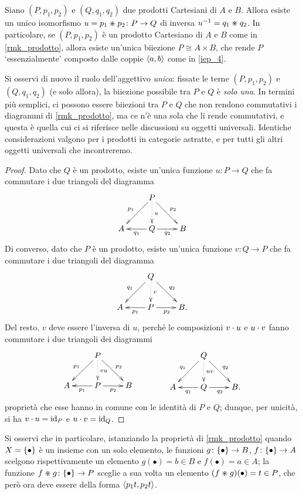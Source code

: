 \begin{lemma}\label{prodotto_unico_upto_iso}
 Siano \((P,p_1,p_2)\) e \((Q,q_1,q_2)\) due prodotti	Cartesiani di \(A\) e \(B\). Allora esiste un unico isomorfismo \(u= p_1\divideontimes p_2 \colon P\to Q\) di inversa \(u^{-1} = q_1\divideontimes q_2\). In particolare, se \((P,p_1,p_2)\) è un prodotto Cartesiano di \(A\) e \(B\) come in \ref{rmk_prodotto}, allora esiste un'unica biiezione \(P\cong A\times B\), che rende \(P\) `essenzialmente' composto dalle coppie \(\langle a,b\rangle\) come in \ref{iep_4}.
\end{lemma}
Si osservi di nuovo il ruolo dell'aggettivo \emph{unica}: fissate le terne \((P,p_1,p_2)\) e \((Q,q_1,q_2)\) (e solo allora), la biiezione possibile tra \(P\) e \(Q\) è \emph{solo una}. In termini più semplici, ci possono essere biiezioni tra \(P\) e \(Q\) che non rendono commutativi i diagrammi di \ref{rmk_prodotto}, ma ce n'è una sola che li rende commutativi, e questa è quella cui ci si riferisce nelle discussioni su oggetti universali. Identiche considerazioni valgono per i prodotti	in categorie astratte, e per tutti gli altri oggetti universali che incontreremo.
\begin{proof}
 Dato che \(Q\) è un prodotto, esiste un'unica	funzione \(u \colon P \to Q\) che fa commutare i due triangoli del diagramma
 \[\xymatrix{
   & P \ar@{.>}[d]^{u} \ar[dl]_{p_1} \ar[dr]^{p_2}\\
   A & Q \ar[r]_{q_2}\ar[l]^{q_1}& B
  }\]
 Di converso, dato che	\(P\) è un prodotto, esiste un'unica funzione \(v \colon Q \to P\) che fa commutare i due triangoli del diagramma
 \[\xymatrix{
   & Q \ar@{.>}[d]^v \ar[dl]_{q_1} \ar[dr]^{q_2}\\
   A & P \ar[r]_{p_2}\ar[l]^{p_1}& B.
  }\]
 Del resto, \(v\) deve essere l'inversa di \(u\), perché le composizioni \(v\cdot u\) e \(u\cdot v\) fanno commutare i due triangoli dei diagrammi
 \[\xymatrix{
   & P \ar@{.>}[d]^{vu} \ar[dl]_{p_1} \ar[dr]^{p_2}\\
   A & P \ar[r]_{p_2}\ar[l]^{p_1}& B
  }\qquad\qquad \xymatrix{
   & Q \ar@{.>}[d]^{uv} \ar[dl]_{q_1} \ar[dr]^{q_2}\\
   A & Q \ar[r]_{q_2}\ar[l]^{q_1}& B.
  }\]
 proprietà che esse hanno in comune con	le identità di \(P\) e \(Q\); dunque, per unicità, si ha \(v\cdot u = \mathrm{id}_P\) e \(u\cdot v = \mathrm{id}_Q\).
\end{proof}
Si osservi che in particolare, istanziando la proprietà di \ref{rmk_prodotto} quando \(X = \{\bullet\}\) è un insieme con un solo elemento, le funzioni \(g\colon \{\bullet\}\to B\), \(f\colon \{\bullet\}\to A\) scelgono rispettivamente un elemento \(g(\bullet) = b \in B\) e \(f(\bullet) = a \in A\); la funzione \(f\divideontimes g\colon \{\bullet\}\to P\) sceglie a sua volta un elemento \((f\divideontimes g)(\bullet) = t \in P\), che però ora deve essere della forma \(\langle p_1 t,p_2 t\rangle\).

